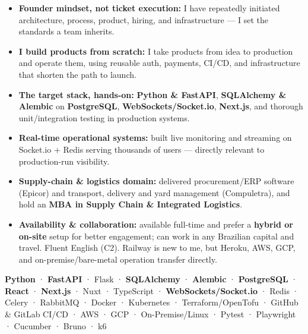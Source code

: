 \documentclass[10pt,a4paper]{altacv}
\begin{document}
\begin{itemize}
\setlength{\itemindent}{0.5em}
\item[--] \textbf{Founder mindset, not ticket execution:} I have repeatedly initiated architecture, process, product, hiring, and infrastructure — I set the standards a team inherits.
\item[--] \textbf{I build products from scratch:} I take products from idea to production and operate them, using reusable auth, payments, CI/CD, and infrastructure that shorten the path to launch.
\item[--] \textbf{The target stack, hands-on:} \textbf{Python \& FastAPI}, \textbf{SQLAlchemy \& Alembic} on \textbf{PostgreSQL}, \textbf{WebSockets/Socket.io}, \textbf{Next.js}, and thorough unit/integration testing in production systems.
\item[--] \textbf{Real-time operational systems:} built live monitoring and streaming on Socket.io + Redis serving thousands of users — directly relevant to production-run visibility.
\item[--] \textbf{Supply-chain \& logistics domain:} delivered procurement/ERP software (Epicor) and transport, delivery and yard management (Compuletra), and hold an \textbf{MBA in Supply Chain \& Integrated Logistics}.
\item[--] \textbf{Availability \& collaboration:} available full-time and prefer a \textbf{hybrid or on-site} setup for better engagement; can work in any Brazilian capital and travel. Fluent English (C2). Railway is new to me, but Heroku, AWS, GCP, and on-premise/bare-metal operation transfer directly.
\end{itemize}


\textbf{Python} · \textbf{FastAPI} · Flask · \textbf{SQLAlchemy} · \textbf{Alembic} · \textbf{PostgreSQL} · \textbf{React} · \textbf{Next.js} · Nuxt · TypeScript · \textbf{WebSockets/Socket.io} · Redis · Celery · RabbitMQ · Docker · Kubernetes · Terraform/OpenTofu · GitHub \& GitLab CI/CD · AWS · GCP · On-Premise/Linux · Pytest · Playwright · Cucumber · Bruno · k6 \\

\break
\newpage
{}

\end{document}
